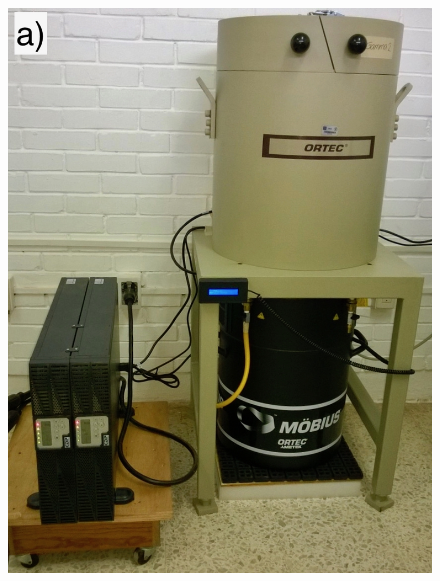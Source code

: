 \begin{figure}[h]
\centering
\includegraphics[height=0.4\textheight]{Imagenes/GammaSystem.jpg}

\end{figure}

